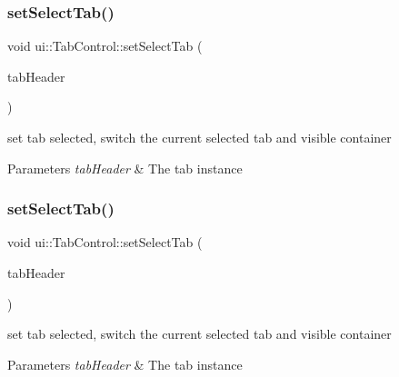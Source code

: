 \subsubsection{\texorpdfstring{set\+Select\+Tab()}{setSelectTab()}\hspace{0.1cm}{\footnotesize\ttfamily [3/4]}}
{\footnotesize\ttfamily void ui\+::\+Tab\+Control\+::set\+Select\+Tab (\begin{DoxyParamCaption}\item[{\hyperlink{classui_1_1TabHeader}{Tab\+Header} $\ast$}]{tab\+Header }\end{DoxyParamCaption})}

set tab selected, switch the current selected tab and visible container 
\begin{DoxyParams}{Parameters}
{\em tab\+Header} & The tab instance \\
\hline
\end{DoxyParams}
\mbox{\label{classui_1_1TabControl_a4312f6e1d6c73d858fc662443b623e93}} 
\subsubsection{\texorpdfstring{set\+Select\+Tab()}{setSelectTab()}\hspace{0.1cm}{\footnotesize\ttfamily [4/4]}}
{\footnotesize\ttfamily void ui\+::\+Tab\+Control\+::set\+Select\+Tab (\begin{DoxyParamCaption}\item[{\hyperlink{classui_1_1TabHeader}{Tab\+Header} $\ast$}]{tab\+Header }\end{DoxyParamCaption})}

set tab selected, switch the current selected tab and visible container 
\begin{DoxyParams}{Parameters}
{\em tab\+Header} & The tab instance \\
\hline
\end{DoxyParams}
\mbox{\label{classui_1_1TabControl_a16fecfa3c0550e2afcfe9280aa633ada}} 
